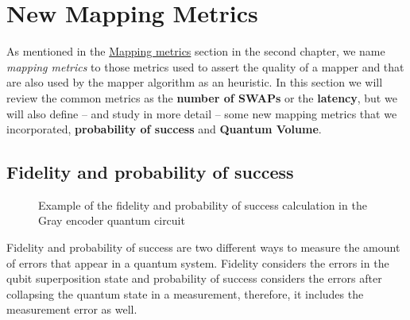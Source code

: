 \section{New Mapping Metrics}
\label{sec:org27990de}
As mentioned in the \hyperref[sec:orgc729465]{Mapping metrics} section in the second chapter, we name \emph{mapping metrics} to those metrics used to assert the quality of a mapper and that are also used by the mapper algorithm as an heuristic.
In this section we will review the common metrics as the \textbf{number of SWAPs} or the \textbf{latency}, but we will also define -- and study in more detail -- some new mapping metrics that we incorporated, \textbf{probability of success} and \textbf{Quantum Volume}.

\subsection{Fidelity and probability of success}
\label{sec:org0c7b2c2}

\begin{figure}
    \centering

\caption{Example of the fidelity and probability of success calculation in the Gray encoder quantum circuit}
\label{fig:latency_swaps_ex_orig}
\end{figure}

Fidelity and probability of success  are two different ways to measure the amount of errors that appear in a quantum system.
Fidelity considers the errors in the qubit superposition state and probability of success considers the errors after collapsing the quantum state in a measurement, therefore, it includes the measurement error as well.

